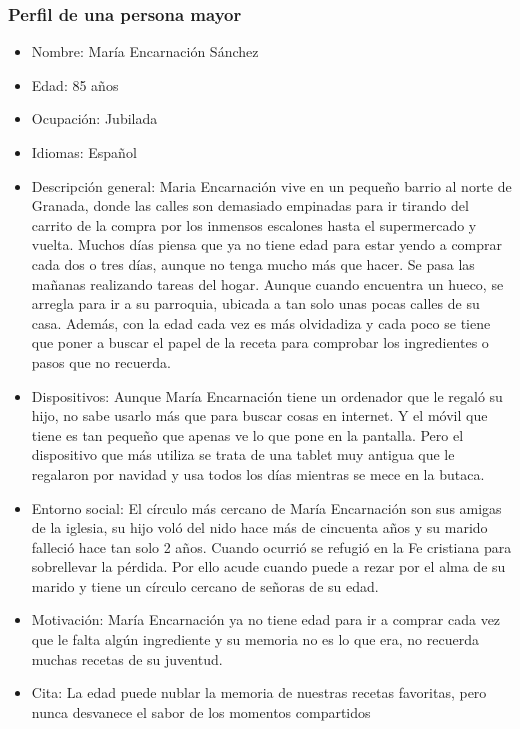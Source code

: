 \subsubsection{Perfil de una persona mayor}
\begin{itemize}
    \item Nombre: María Encarnación Sánchez
    \item Edad: 85 años
    \item Ocupación: Jubilada
    \item Idiomas: Español
    \item Descripción general: Maria Encarnación vive en un pequeño barrio al norte de Granada, donde las calles son demasiado empinadas para ir tirando del carrito de la compra por los inmensos escalones hasta el supermercado y vuelta. Muchos días piensa que ya no tiene edad para estar yendo a comprar cada dos o tres días, aunque no tenga mucho más que hacer. Se pasa las mañanas realizando tareas del hogar. Aunque cuando encuentra un hueco, se arregla para ir a su parroquia, ubicada a tan solo unas pocas calles de su casa. Además, con la edad cada vez es más olvidadiza y cada poco se tiene que poner a buscar el papel de la receta para comprobar los ingredientes o pasos que no recuerda.
    \item Dispositivos: Aunque María Encarnación tiene un ordenador que le regaló su hijo, no sabe usarlo más que para buscar cosas en internet. Y el móvil que tiene es tan pequeño que apenas ve lo que pone en la pantalla. Pero el dispositivo que más utiliza se trata de una tablet muy antigua que le regalaron por navidad y usa todos los días mientras se mece en la butaca.
    \item Entorno social: El círculo más cercano de María Encarnación son sus amigas de la iglesia, su hijo voló del nido hace más de cincuenta años y su marido falleció hace tan solo 2 años. Cuando ocurrió se refugió en la Fe cristiana para sobrellevar la pérdida. Por ello acude cuando puede a rezar por el alma de su marido y tiene un círculo cercano de señoras de su edad. 
    \item Motivación: María Encarnación ya no tiene edad para ir a comprar cada vez que le falta algún ingrediente y su memoria no es lo que era, no recuerda muchas recetas de su juventud.
    \item Cita: La edad puede nublar la memoria de nuestras recetas favoritas, pero nunca desvanece el sabor de los momentos compartidos
\end{itemize}

